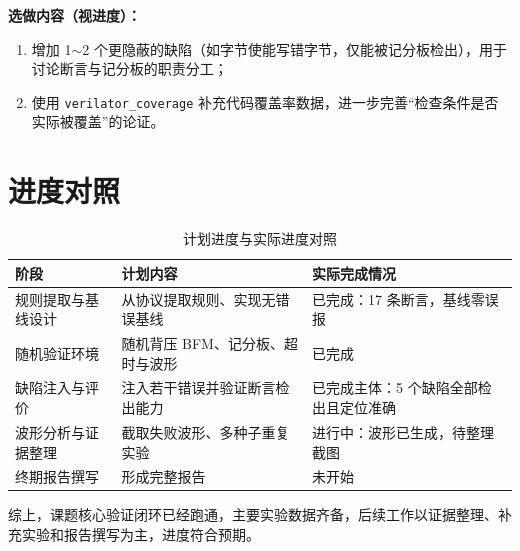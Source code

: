 \documentclass[12pt, a4paper, oneside]{ctexart}
\begin{document}
\textbf{选做内容（视进度）：}
\begin{enumerate}
  \item 增加 1$\sim$2 个更隐蔽的缺陷（如字节使能写错字节，仅能被记分板检出），用于讨论断言与记分板的职责分工；
  \item 使用 \texttt{verilator\_coverage} 补充代码覆盖率数据，进一步完善``检查条件是否实际被覆盖''的论证。
\end{enumerate}

\section{进度对照}

\begin{table}[H]
\centering
\caption{计划进度与实际进度对照}
\begin{tabularx}{\textwidth}{lXl}
\toprule
阶段 & 计划内容 & 实际完成情况 \\
\midrule
规则提取与基线设计 & 从协议提取规则、实现无错误基线 & 已完成：17 条断言，基线零误报 \\
随机验证环境 & 随机背压 BFM、记分板、超时与波形 & 已完成 \\
缺陷注入与评价 & 注入若干错误并验证断言检出能力 & 已完成主体：5 个缺陷全部检出且定位准确 \\
波形分析与证据整理 & 截取失败波形、多种子重复实验 & 进行中：波形已生成，待整理截图 \\
终期报告撰写 & 形成完整报告 & 未开始 \\
\bottomrule
\end{tabularx}
\end{table}

综上，课题核心验证闭环已经跑通，主要实验数据齐备，后续工作以证据整理、补充实验和报告撰写为主，进度符合预期。
\end{document}
